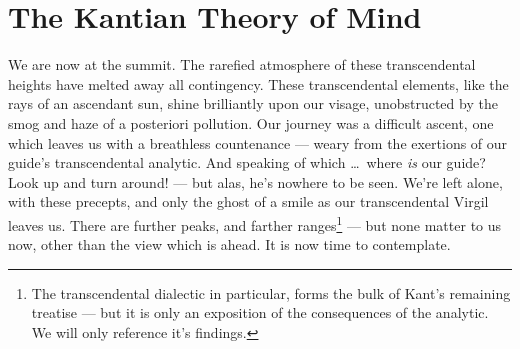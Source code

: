 \section{The Kantian Theory of Mind}
We are now at the summit. The rarefied atmosphere of these transcendental heights have melted away all contingency. These transcendental elements, like the rays of an ascendant sun, shine brilliantly upon our visage, unobstructed by the smog and haze of a posteriori pollution. Our journey was a difficult ascent, one which leaves us with a breathless countenance --- weary from the exertions of our guide's transcendental analytic. And speaking of which \ldots\ where \emph{is} our guide? Look up and turn around! --- but alas, he's nowhere to be seen. We're left alone, with these precepts, and only the ghost of a smile as our transcendental Virgil leaves us. There are further peaks, and farther ranges\footnote{The transcendental dialectic in particular, forms the bulk of Kant's remaining treatise --- but it is only an exposition of the consequences of the analytic. We will only reference it's findings.} --- but none matter to us now, other than the view which is ahead. It is now time to contemplate.



